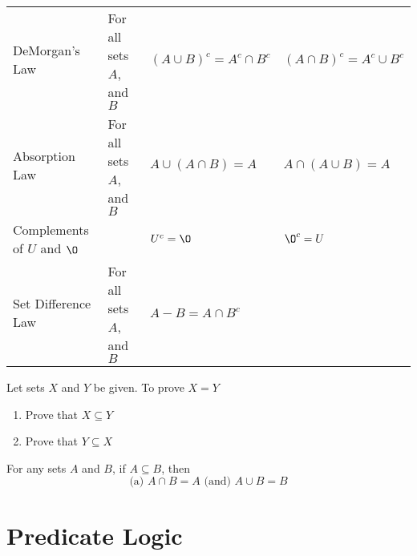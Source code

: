 \documentclass[11pt]{article}
\begin{document}
\begin{table}[!htbp]
\begin{adjustwidth}{-1.5cm}{-1.5cm}
{\begin{tabular}{ *{4}{l} }
            DeMorgan's Law          & For all sets $A$, and $B$
                                    & $(A \cup B)^c = A^c \cap B^c$
                                    & $(A \cap B)^c = A^c \cup B^c$ \\
            Absorption Law          & For all sets $A$, and $B$
                                    & $A \cup (A \cap B) = A$
                                    & $A \cap (A \cup B) = A$ \\
            Complements of
                $U$ and $\O$        &
                                    & $U^c = \O$
                                    & $\O^c = U$ \\
                Set Difference Law  & For all sets $A$, and $B$
                                    & $A - B = A \cap B^c$
                                    & \\
            \bottomrule
        \end{tabular}
        \label{tab:tbl-set-identities}
        }
        \end{adjustwidth}
    \end{table}

\begin{definition}\label{def:prove-set-eq}
    Let sets $X$ and $Y$ be given. To prove $X = Y$
    \begin{enumerate}
        \item Prove that $X \subseteq Y$
        \item Prove that $Y \subseteq X$
    \end{enumerate}
\end{definition}

\begin{definition}\label{def:intersect-union-subset}
    For any sets $A$ and $B$, if $A \subseteq B$, then
    \begin{equation*}
        \text{(a) } A \cap B = A \text{ (and) } A \cup B = B
    \end{equation*}
\end{definition}


\newpage
\section{Predicate Logic}
\end{document}
